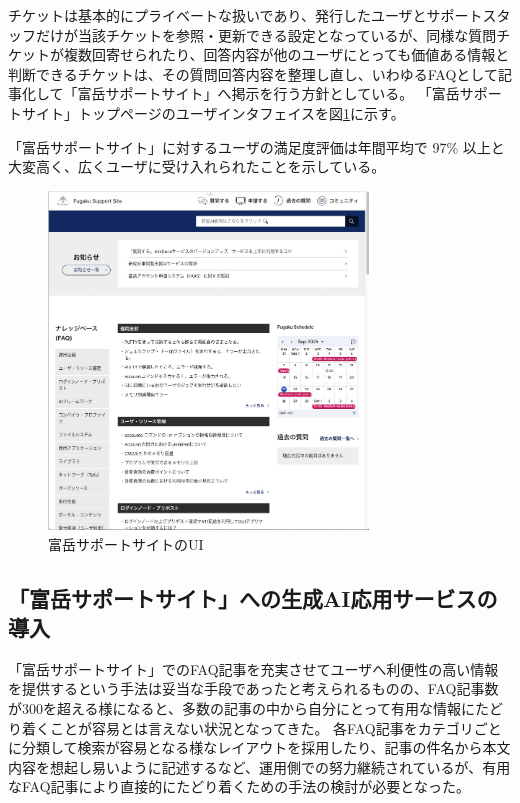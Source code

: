 \documentclass{jsaxiesproc}
\begin{document}
チケットは基本的にプライベートな扱いであり、発行したユーザとサポートスタッフだけが当該チケットを参照・更新できる設定となっているが、同様な質問チケットが複数回寄せられたり、回答内容が他のユーザにとっても価値ある情報と判断できるチケットは、その質問回答内容を整理し直し、いわゆるFAQとして記事化して「富岳サポートサイト」へ掲示を行う方針としている。
「富岳サポートサイト」トップページのユーザインタフェイスを図\ref{fig:FugakuSupportSite-Top.jpg}に示す。

「富岳サポートサイト」に対するユーザの満足度評価は年間平均で 97\% 以上と大変高く、広くユーザに受け入れられたことを示している。

\begin{figure}[htbp]
\includegraphics[width=8.5cm]{figs/FugakuSupportSite-Top.jpg}
\caption{富岳サポートサイトのUI}
\label{fig:FugakuSupportSite-Top.jpg}
\end{figure}



\subsection{「富岳サポートサイト」への生成AI応用サービスの導入}

「富岳サポートサイト」でのFAQ記事を充実させてユーザへ利便性の高い情報を提供するという手法は妥当な手段であったと考えられるものの、FAQ記事数が300を超える様になると、多数の記事の中から自分にとって有用な情報にたどり着くことが容易とは言えない状況となってきた。
各FAQ記事をカテゴリごとに分類して検索が容易となる様なレイアウトを採用したり、記事の件名から本文内容を想起し易いように記述するなど、運用側での努力継続されているが、有用なFAQ記事により直接的にたどり着くための手法の検討が必要となった。
\end{document}
